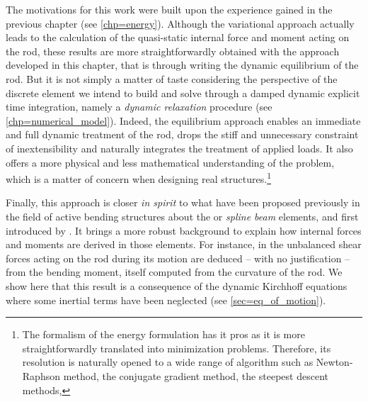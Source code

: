 The motivations for this work were built upon the experience gained in the previous chapter (see \cref{chp=energy}). Although the variational approach actually leads to the calculation of the quasi-static internal force and moment acting on the rod, these results are more straightforwardly obtained with the approach developed in this chapter, that is through writing the dynamic equilibrium of the rod. But it is not simply a matter of taste considering the perspective of the discrete element we intend to build and solve through a damped dynamic explicit time integration, namely a \emph{dynamic relaxation} procedure (see \cref{chp=numerical_model}). Indeed, the equilibrium approach enables an immediate and full dynamic treatment of the rod, drops the stiff and unnecessary constraint of inextensibility and naturally integrates the treatment of applied loads. It also offers a more physical and less mathematical understanding of the problem, which is a matter of concern when designing real structures.\footnote{The formalism of the energy formulation has it pros as it is more straightforwardly translated into minimization problems. Therefore, its resolution is naturally opened to a wide range of algorithm such as Newton-Raphson method, the conjugate gradient method, the steepest descent methods, \telp{}}

Finally, this approach is closer \emph{in spirit} to what have been proposed previously in the field of active bending structures about the  or  \emph{spline beam} elements, and first introduced by . It brings a more robust background to explain how internal forces and moments are derived in those elements. For instance, in \cite{Adriaenssens2001,Douthe2006,DAmico2014} the unbalanced shear forces acting on the rod during its motion are deduced -- with no justification -- from the bending moment, itself computed from the curvature of the rod. We show here that this result is a consequence of the dynamic Kirchhoff equations where some inertial terms have been neglected (see \cref{sec=eq_of_motion}).



